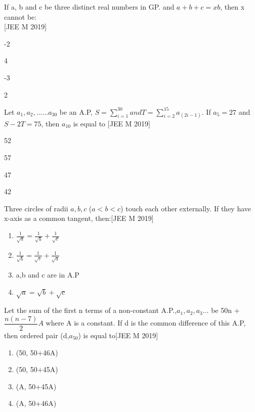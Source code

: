 \documentclass[journal,12pt,twocolumn]{IEEEtran}
\theoremstyle{remark}
\begin{document}
\begin{enumerate}
{  \item{If a, b and c be three distinct real numbers in GP. and $a+b+c=xb$, then x cannot be:\\ \null \hfill{[JEE M 2019]}
\begin{enumerate}
  \begin{multicols}{2}
  \item {-2} \item{4}\columnbreak
  \item{-3}
  \item{2}
  \end{multicols}
  \end{enumerate}}
  \item {Let $a_{1},a_{2},......a_{30}$ be an A.P, $S=\sum_{i=1}^{30} and T=\sum_{i=2}^{15}a_{(2i-1)}$. If $a_{5}=27$
	  and $S-2T=75$, then $a_{10}$ is equal to \null \hfill{[JEE M 2019]}
\begin{enumerate}
  \begin{multicols}{2}
  \item {52} \item{57}\columnbreak
  \item{47}
  \item{42}
  \end{multicols}
  \end{enumerate}}
\item{Three circles of radii $a, b, c$ ($a<b<c$) touch each other externally. If they have x-axis as a common tangent, then:\hfill{[JEE M 2019]}\begin{enumerate} \itemsep.5em	
  
  \item {$\frac{1}{\sqrt{a}}=\frac{1}{\sqrt{b}}+\frac{1}{\sqrt{c}}$} 
  \item {$\frac{1}{\sqrt{b}}=\frac{1}{\sqrt{c}}+\frac{1}{\sqrt{a}}$} 
  \item{a,b and c are in A.P}
  \item{${\sqrt{a}}={\sqrt{b}}+{\sqrt{c}}$}
  \end{enumerate}} 
  \item{Let the sum of the first n terms of a non-constant A.P.,$a_{1},a_{2},a_{3}$... be 50n + $\dfrac{n(n-7)}{2}A$
	  where A is a constant. If d is the common difference of this A.P, then ordered pair (d,$a_{50}$) is equal to\hfill{[JEE M 2019]}} \vspace{.5em}\begin{enumerate}
		  \itemsep.5em  \item {(50, 50+46A)} \item{(50, 50+45A)}
  \item{(A, 50+45A)}
  \item{(A, 50+46A)}
  \end{enumerate}}
  \end{enumerate}

  
\end{document}
